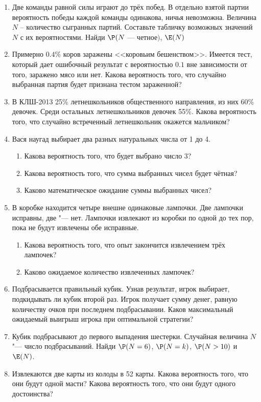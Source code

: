 \documentclass[pdftex,12pt,a4paper]{article}
\begin{document}
\begin{enumerate}[resume]
\item Две команды равной силы играют до трёх побед. В отдельно взятой партии вероятность победы каждой команды одинакова, ничья невозможна.  Величина $N$ -- количество сыгранных партий. Составьте табличку возможных значений $N$ с их вероятностями. Найди $\P(N$ --- четное$)$, $\E(N)$ 

\item Примерно $0.4$\% коров заражены <<коровьим бешенством>>.  Имеется тест, который дает ошибочный результат с вероятностью $0.1$ вне зависимости от того, заражено мясо или нет. Какова вероятность того, что случайно выбранная партия будет признана тестом зараженной?

\item В КЛШ-2013 25\% летнешкольников общественного направления, из них 60\% девочек. Среди остальных летнешкольников девочек 55\%. Какова вероятность того, что случайно встреченный летнешкольник окажется мальчиком?

\item Вася наугад выбирает два разных натуральных числа от 1 до 4.
\begin{enumerate}
\item Какова вероятность того, что будет выбрано число 3?
\item Какова вероятность того, что сумма выбранных чисел будет чётная?
\item Каково математическое ожидание суммы выбранных чисел?
\end{enumerate}

\item  В коробке находится четыре внешне одинаковые лампочки. Две
лампочки исправны, две "--- нет. Лампочки извлекают из коробки по
одной до тех пор, пока не будут извлечены обе исправные.
\begin{enumerate}
\item Какова вероятность того, что опыт закончится извлечением трёх
лампочек?
\item  Каково ожидаемое количество извлеченных лампочек?
\end{enumerate}

\item Подбрасывается правильный кубик. Узнав результат, игрок выбирает,
подкидывать ли кубик второй раз. Игрок получает сумму денег, равную
количеству очков при последнем подбрасывании. Каков максимальный ожидаемый выигрыш игрока при оптимальной стратегии?

\item Кубик подбрасывают до первого выпадения шестерки. Случайная величина  $N$ "---
число подбрасываний. Найди $\P(N=6)$, $\P(N=k)$, $\P(N>10)$ и  $\E(N)$.

\item Извлекаются две карты из колоды в 52 карты. Какова вероятность того, что они будут одной масти? Какова вероятность того, что они будут одного достоинства?


\end{enumerate}
\end{document}
